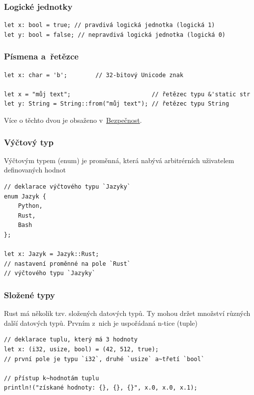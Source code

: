 \documentclass[a4paper, 12pt]{article} %
\begin{document}
        \subsubsection*{Logické jednotky}
            \begin{verbatim}
let x: bool = true; // pravdivá logická jednotka (logická 1)
let y: bool = false; // nepravdivá logická jednotka (logická 0)
            \end{verbatim}


        \subsubsection*{Písmena a~řetězce}
            \begin{verbatim}
let x: char = 'b';        // 32-bitový Unicode znak

let x = "můj text";                       // řetězec typu &'static str
let y: String = String::from("můj text"); // řetězec typu String
        \end{verbatim}
            Více o těchto dvou je obsaženo v~\hyperlink{vlast}{Bezpečnost}.


        \subsubsection*{Výčtový typ}
            Výčtovým typem (enum) je proměnná, která nabývá arbitrérních uživatelem definovaných hodnot
            \begin{verbatim}
// deklarace výčtového typu `Jazyky`
enum Jazyk {
    Python,
    Rust,
    Bash
};

let x: Jazyk = Jazyk::Rust;
// nastavení proměnné na pole `Rust`
// výčtového typu `Jazyky`
            \end{verbatim}


        \subsubsection*{Složené typy}
            Rust má několik tzv. složených datových typů. Ty mohou držet množství různých další datových typů. Prvním z~nich je uspořádaná n-tice (tuple)

            \begin{verbatim}
// deklarace tuplu, který má 3 hodnoty
let x: (i32, usize, bool) = (42, 512, true);
// první pole je typu `i32`, druhé `usize` a~třetí `bool`

// přístup k~hodnotám tuplu
println!("získané hodnoty: {}, {}, {}", x.0, x.0, x.1);
            \end{verbatim}
        
\end{document}
